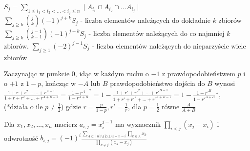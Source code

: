 $S_j = \sum\limits_{1\leq i_1<i_2<\ldots<i_j\leq n} \mid A_{i_1}\cap A_{i_2} \cap \ldots A_{i_j} \mid$\\
$\sum\limits_{j\geq k}{j \choose k}(-1)^{j + k}S_j$ - liczba elementów należących do dokładnie $k$ zbiorów\\
$\sum\limits_{j\geq k}{j - 1 \choose k - 1}(-1)^{j + k}S_j$ - liczba elementów należących do co najmniej $k$ zbiorów.
$\sum\limits_{j\geq 1}(-2)^{j-1}S_j$ - liczba elementów należących do nieparzyście wiele zbiorów

Zaczynając w punkcie $0$, idąc w każdym ruchu o $-1$ z prawdopodobieństwem $p$ i o $+1$ z $1 - p$, kończąc w $-A$ lub $B$ prawdopodobieństwo dojścia do $B$ wynosi
$\frac{1 + r + r^2 + \ldots + r^{A - 1}}{1 + r + r^2 + \ldots + r^{A + B - 1}} = \frac{1 - r^A}{1 - r^{A + B}}^* = 1 - \frac{1 + r' + r'^2 + \ldots + r'^{B - 1}}{1 + r' + r'^2 + \ldots + r'^{A + B - 1}} = 1 - \frac{1 - r'^B}{1 - r'^{A + B}}*,$ \\ (*działa o ile $p \neq \frac12$) gdzie $r = \frac{p}{1 - p}, r' = \frac1r$, dla $p=\frac12$ równe $\frac{A}{A+B}$

Dla $x_1, x_2, \ldots, x_n$ macierz $a_{i,j}=x_i^{j - 1}$ ma wyznacznik $\prod\limits_{i<j}(x_j - x_i)$ i odwrotność
$b_{i,j} = (-1)^i\frac{\sum\limits_{A \subset [n]\setminus \lbrace j \rbrace, |A| = n - i}\prod\limits_{k \in A} x_k}{\prod\limits_{k\neq j}(x_k - x_j)}$
